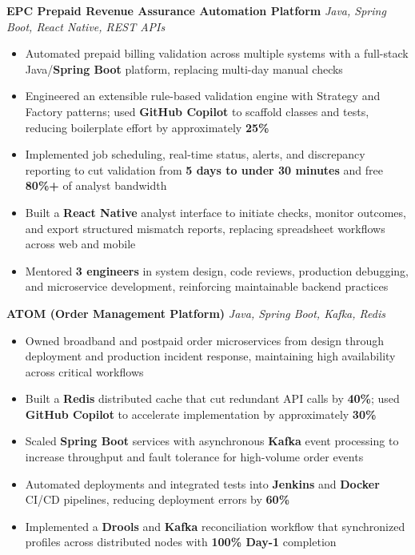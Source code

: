 \documentclass[letterpaper,11pt]{article}
\newcommand{\resumeItem}[1]{
  \item\small{{#1 \vspace{-2pt}}}
}
\newcommand{\resumeItemListStart}{\begin{itemize}}
\newcommand{\resumeItemListEnd}{\end{itemize}\vspace{-5pt}}
\begin{document}
      \vspace{4pt}
      \vspace{4pt}
      \textbf{\small EPC Prepaid Revenue Assurance Automation Platform} \hfill \textit{\small Java, Spring Boot, React Native, REST APIs} \\
      \vspace{-2pt}
      \resumeItemListStart
        \resumeItem{Automated prepaid billing validation across multiple systems with a full-stack Java/\textbf{Spring Boot} platform, replacing multi-day manual checks}
        \resumeItem{Engineered an extensible rule-based validation engine with Strategy and Factory patterns; used \textbf{GitHub Copilot} to scaffold classes and tests, reducing boilerplate effort by approximately \textbf{25\%}}
        \resumeItem{Implemented job scheduling, real-time status, alerts, and discrepancy reporting to cut validation from \textbf{5 days to under 30 minutes} and free \textbf{80\%+} of analyst bandwidth}
        \resumeItem{Built a \textbf{React Native} analyst interface to initiate checks, monitor outcomes, and export structured mismatch reports, replacing spreadsheet workflows across web and mobile}
        \resumeItem{Mentored \textbf{3 engineers} in system design, code reviews, production debugging, and microservice development, reinforcing maintainable backend practices}
      \resumeItemListEnd

      \vspace{4pt}
      \textbf{\small ATOM (Order Management Platform)} \hfill \textit{\small Java, Spring Boot, Kafka, Redis} \\
      \vspace{-2pt}
      \resumeItemListStart
        \resumeItem{Owned broadband and postpaid order microservices from design through deployment and production incident response, maintaining high availability across critical workflows}
        \resumeItem{Built a \textbf{Redis} distributed cache that cut redundant API calls by \textbf{40\%}; used \textbf{GitHub Copilot} to accelerate implementation by approximately \textbf{30\%}}
        \resumeItem{Scaled \textbf{Spring Boot} services with asynchronous \textbf{Kafka} event processing to increase throughput and fault tolerance for high-volume order events}
        \resumeItem{Automated deployments and integrated tests into \textbf{Jenkins} and \textbf{Docker} CI/CD pipelines, reducing deployment errors by \textbf{60\%}}
        \resumeItem{Implemented a \textbf{Drools} and \textbf{Kafka} reconciliation workflow that synchronized profiles across distributed nodes with \textbf{100\% Day-1} completion}
      \resumeItemListEnd
\end{document}
